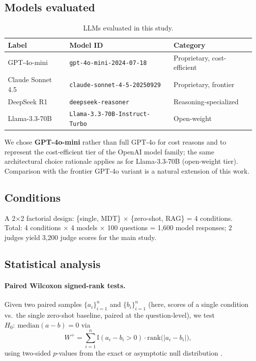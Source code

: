 \documentclass[final, 11pt, 3p]{elsarticle}
\begin{document}
\subsection{Models evaluated}
\begin{table}[!ht]
\caption{LLMs evaluated in this study.}
\label{tab:models}
\centering
\small
\begin{tabular}{lll}
\toprule
Label & Model ID & Category \\
\midrule
GPT-4o-mini \cite{GPT4oMini} & \texttt{gpt-4o-mini-2024-07-18} & Proprietary, cost-efficient \\
Claude Sonnet 4.5 \cite{ClaudeSonnet45} & \texttt{claude-sonnet-4-5-20250929} & Proprietary, frontier \\
DeepSeek R1 \cite{DeepSeekR1} & \texttt{deepseek-reasoner} & Reasoning-specialized \\
Llama-3.3-70B \cite{Llama33} & \texttt{Llama-3.3-70B-Instruct-Turbo} & Open-weight \\
\bottomrule
\end{tabular}
\end{table}

We chose \textbf{GPT-4o-mini} rather than full GPT-4o for cost reasons
and to represent the cost-efficient tier of the OpenAI model family;
the same architectural choice rationale applies as for Llama-3.3-70B
(open-weight tier). Comparison with the frontier GPT-4o variant is a
natural extension of this work.

\subsection{Conditions}
A 2$\times$2 factorial design: \{single, MDT\} $\times$ \{zero-shot,
RAG\} = 4 conditions. Total: 4 conditions $\times$ 4 models $\times$
100 questions = 1{,}600 model responses; 2 judges yield 3{,}200 judge
scores for the main study.

\subsection{Statistical analysis}
\label{sec:stats}

\paragraph{Paired Wilcoxon signed-rank tests.} Given two paired samples
$\{a_i\}_{i=1}^{n}$ and $\{b_i\}_{i=1}^{n}$ (here, scores of a single
condition vs.\ the single zero-shot baseline, paired at the
question-level), we test $H_0{:}\ \mathrm{median}(a-b) = 0$ via
\begin{equation}
W^{+} = \sum_{i=1}^{n} \mathbb{I}(a_i - b_i > 0) \cdot \mathrm{rank}\bigl(|a_i - b_i|\bigr),
\label{eq:wilcoxon}
\end{equation}
using two-sided $p$-values from the exact or asymptotic null
distribution \cite{Wilcoxon1945}.
\end{document}
